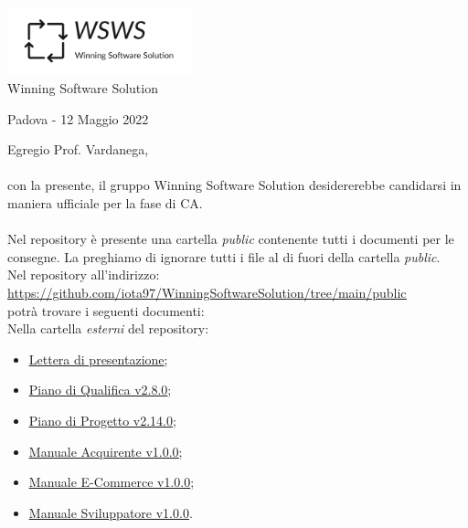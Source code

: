 \documentclass[a4paper, 12pt]{letter}
\begin{document}
\begin{center}
\includegraphics[width=0.4\textwidth]{WSWS-logos_transparent_crop}\\
{\Large Winning Software Solution}\\[24pt]
\end{center}
\begin{flushright}
    Padova - 12 Maggio 2022
\end{flushright}
Egregio Prof. Vardanega,\\\\
con la presente, il gruppo Winning Software Solution desidererebbe candidarsi in maniera ufficiale
per la fase di CA.\\\\
Nel repository è presente una cartella \textit{public} contenente tutti i documenti per le consegne. La preghiamo di ignorare tutti i file
al di fuori della cartella \textit{public}.\\
Nel repository all'indirizzo: \\
\href{https://github.com/iota97/WinningSoftwareSolution/tree/main/public}{\underline{https://github.com/iota97/WinningSoftwareSolution/tree/main/public}}\\ 
potrà trovare i seguenti documenti:\\

Nella cartella \textit{esterni} del repository:
\begin{itemize}
\item \href{https://github.com/iota97/WinningSoftwareSolution/tree/main/public/esterni/lettera_di_presentazione.pdf}{\underline{Lettera di presentazione}};
\item \href{https://github.com/iota97/WinningSoftwareSolution/tree/main/public/esterni/piano_di_qualifica_v2.8.0.pdf}{\underline{Piano di Qualifica v2.8.0}};
\item \href{https://github.com/iota97/WinningSoftwareSolution/tree/main/public/esterni/piano_di_progetto_v2.14.0.pdf}{\underline{Piano di Progetto v2.14.0}};
\item \href{https://github.com/iota97/WinningSoftwareSolution/tree/main/public/esterni/manuale_acquirente_v1.0.0.pdf}{\underline{Manuale Acquirente v1.0.0}};
\item \href{https://github.com/iota97/WinningSoftwareSolution/tree/main/public/esterni/manuale_e-commerce_v1.0.0.pdf}{\underline{Manuale E-Commerce v1.0.0}};
\item \href{https://github.com/iota97/WinningSoftwareSolution/tree/main/public/esterni/manuale_sviluppatore_v1.0.0.pdf}{\underline{Manuale Sviluppatore v1.0.0}}.
\end{itemize}
\end{document}
